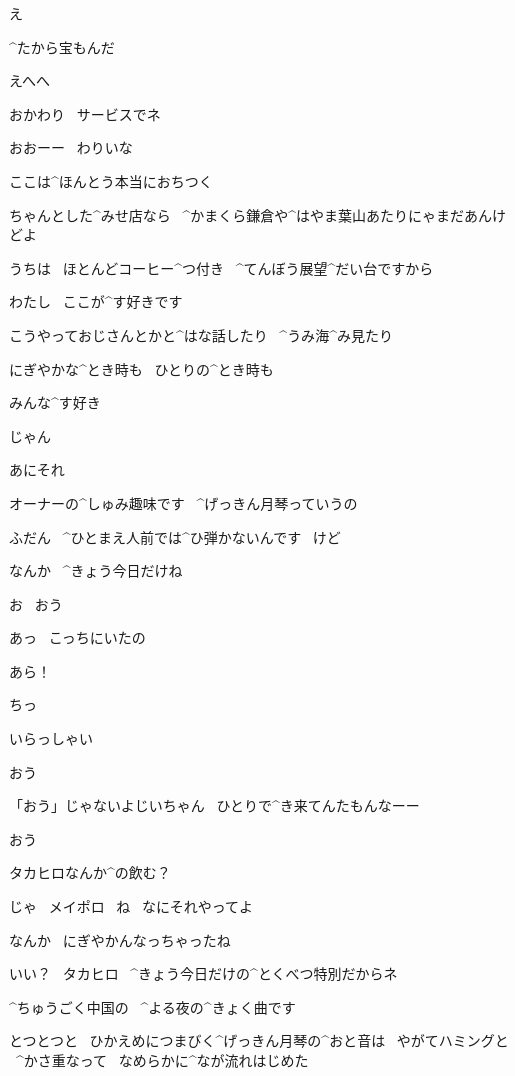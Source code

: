 \Alpha え

\Ojisan ^{たから}{宝}もんだ

\Alpha えへへ

\page
\Alpha おかわり
\ サービスでネ

\Ojisan おおーー
\ わりいな

\page
\Ojisan ここは^{ほんとう}{本当}におちつく

\Alpha ちゃんとした^{みせ}{店}なら
\ ^{かまくら}{鎌倉}や^{はやま}{葉山}あたりにゃまだあんけどよ

\Alpha うちは
\ ほとんどコーヒー^{つ}{付}き
\ ^{てんぼう}{展望}^{だい}{台}ですから

\Alpha わたし
\ ここが^{す}{好}きです

\Alpha こうやっておじさんとかと^{はな}{話}したり
\ ^{うみ}{海}^{み}{見}たり

\Alpha にぎやかな^{とき}{時}も
\ ひとりの^{とき}{時}も

\Alpha みんな^{す}{好}き

\page
\Alpha じゃん

\Ojisan あにそれ

\Alpha オーナーの^{しゅみ}{趣味}です
\ ^{げっきん}{月琴}っていうの

\Alpha ふだん
\ ^{ひとまえ}{人前}では^{ひ}{弾}かないんです
\ けど

\page
\Alpha なんか
\ ^{きょう}{今日}だけね

\Ojisan お
\ おう

\Takahiro あっ
\ こっちにいたの

\Alpha あら！

\Ojisan ちっ

\Alpha いらっしゃい

\Ojisan おう

\Takahiro 「おう」じゃないよじいちゃん
\ ひとりで^{き}{来}てんたもんなーー

\Ojisan おう

\Alpha タカヒロなんか^{の}{飲}む？

\page
\Takahiro じゃ
\ メイポロ
\ ね
\ なにそれやってよ

\Alpha なんか
\ にぎやかんなっちゃったね

\Alpha いい？
\ タカヒロ
\ ^{きょう}{今日}だけの^{とくべつ}{特別}だからネ

\Alpha ^{ちゅうごく}{中国}の
\ ^{よる}{夜}の^{きょく}{曲}です

\page[39]
\Ojisan とつとつと
\ ひかえめにつまびく^{げっきん}{月琴}の^{おと}{音}は
\ やがてハミングと
\ ^{かさ}{重}なって
\ なめらかに^{なが}{流}れはじめた

